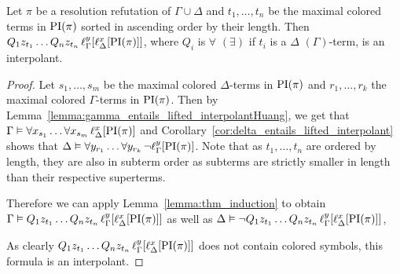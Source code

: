 \begin{thm}
	Let $\pi$ be a resolution refutation of $\Gamma \cup \Delta$ and
	$t_1, \dots, t_n$ be the maximal colored terms in $\PI(\pi)$ sorted in ascending order by their length.
	Then
	$Q_1 z_{t_1} \ldots Q_n z_{t_n}\,\lifgamma{\lifdelta{\PI(\pi)}}$, where $Q_i$ is $\forall$ $(\exists)$ if ${t_i}$ is a $\Delta$ $(\Gamma)$-term, is an interpolant.
\end{thm}
\begin{proof}
	Let $s_1, \dots, s_m$ be the maximal colored $\Delta$-terms in $\PI(\pi)$ and
	$r_1, \dots, r_k$ the maximal colored $\Gamma$-terms in $\PI(\pi)$.
	Then by Lemma~\ref{lemma:gamma_entails_lifted_interpolantHuang}, we get that 
	$\Gamma \entails \forall x_{s_1} \ldots \forall x_{s_m}\,\lifdelta{\PI(\pi)}$
	and Corollary~\ref{cor:delta_entails_lifted_interpolant} shows that 
	$\Delta \entails \forall y_{r_1} \dots \forall y_{r_{k}}\,\lnot \lift{\Gamma}{\PI(\pi)}{y}$.
	Note that as $t_1, \dots, t_n$ are ordered by length, they are also in subterm order as subterms are strictly smaller in length than their respective superterms.

	Therefore we can apply Lemma~\ref{lemma:thm_induction} to obtain 
	$\Gamma \entails Q_1 z_{t_1} \ldots Q_n z_{t_n}\,\lifgamma{\lifdelta{\PI(\pi)}}$ 
	as well as 
	$\Delta \entails \lnot Q_1 z_{t_1} \ldots Q_n z_{t_n}\,\lifgamma{\lifdelta{\PI(\pi)}}$,

	As clearly $Q_1 z_{t_1} \dots Q_n z_{t_n}\,\lft{\Gamma}{y}{\lft{\Delta}{x}{\PI(\pi)}}$ does not contain colored symbols, this formula is an interpolant.
\end{proof}

